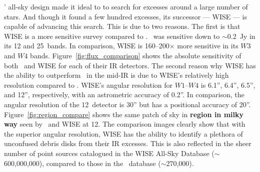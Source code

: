    
    \iras' all-sky design made it ideal to to search for excesses around a large number of stars. And though it found a few hundred excesses, its successor --- WISE --- is capable of advancing this search. This is due to two reasons. The first is that WISE is a more sensitive survey compared to \iras. \iras\ was sensitive down to $\sim$0.2~Jy in its 12 and 25\micron\ bands. In comparison, WISE is 160--200$\times$ more sensitive in its $W3$ and $W4$ bands. Figure~\ref{fig:flux_comparison} shows the absolute sensitivity of both \iras\ and WISE for each of their IR detectors. The second reason why WISE has the ability to outperform \iras\ in the mid-IR is due to WISE's relatively high resolution compared to \iras. WISE's angular resolution for $W1$--$W4$ is 6.1'', 6.4'', 6.5'', and 12'', respectively, with an astrometric accuracy of 0.2''. In comparison, the angular resolution of the 12\micron\ detector is 30'' but has a positional accuracy of 20''. Figure~\ref{fig:region_compare} shows the same patch of sky in \textbf{region in milky way} seen by \iras\ and WISE at 12\micron. The comparison images clearly show that with the superior angular resolution, WISE has the ability to identify a plethora of unconfused debris disks from their IR excesses. This is also reflected in the sheer number of point sources catalogued in the WISE All-Sky Database ($\sim$600,000,000), compared to those in the \iras\ database ($\sim$270,000). 
    
    
    
    
